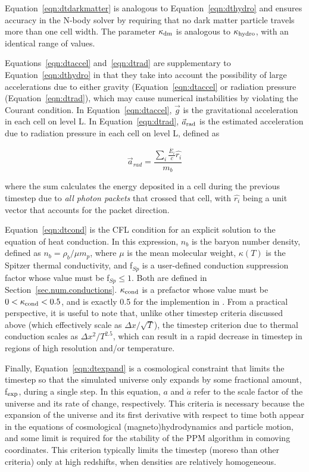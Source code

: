 Equation~\ref{eqn:dtdarkmatter} is analogous to
Equation~\ref{eqn:dthydro} and ensures accuracy in the N-body solver
by requiring that no dark matter particle travels more than one cell
width.  The parameter $\kappa_{\rm dm}$ is analogous to $\kappa_{\rm
  hydro}$, with an identical range of values.

Equations~\ref{eqn:dtaccel} and~\ref{eqn:dtrad} are supplementary to Equation~\ref{eqn:dthydro} in that they
take into account the possibility of large accelerations due to either
gravity (Equation~\ref{eqn:dtaccel} or radiation pressure
(Equation~\ref{eqn:dtrad}), which may cause numerical 
instabilities by violating the Courant condition.  In Equation~\ref{eqn:dtaccel}, $\vec{g}$ is the
gravitational acceleration in each cell on level L.  In
Equation~\ref{eqn:dtrad}, $\vec{a}_{\rm rad}$ is the estimated
acceleration due to radiation pressure in each cell on level L,
defined as

\begin{equation}
\vec{a}_{rad} = \frac{ \sum_i \frac{\dot{E_i}}{c} \hat{r_i} }{m_b} 
\end{equation}

where the sum calculates the energy deposited in a cell during the
previous timestep due to \textit{all photon packets} that crossed that
cell, with $\hat{r_i}$ being a unit vector that accounts for the
packet direction.

Equation~\ref{eqn:dtcond} is the CFL condition for an explicit
solution to the equation of heat conduction.  In this expression,
$n_b$ is the baryon number density, defined as $n_b = \rho_b / \mu
m_p$, where $\mu$ is the mean molecular weight, $\kappa(T)$ is the
Spitzer thermal conductivity, and f$_{Sp}$ is a user-defined
conduction suppression factor whose value must be f$_{Sp} \leq 1$.  Both are defined in
Section~\ref{sec.num.conductions}.  $\kappa_{\rm cond}$ is a prefactor whose
value must be $0 < \kappa_{\rm cond}  < 0.5$, and is exactly 0.5 for the
implemention in \enzo.
From a practical
perspective, it is useful to note that, unlike other timestep criteria
discussed above (which effectively scale as $\Delta x / \sqrt{T}$),
the timestep criterion due to thermal conduction scales as $\Delta x^2
/ T^{2.5}$, which can result in a rapid decrease in timestep in
regions of high resolution and/or temperature.

Finally, Equation~\ref{eqn:dtexpand} is a cosmological constraint that
limits the timestep so that the simulated universe only expands by
some fractional amount, f$_{\rm exp}$, during a single step.  In this
equation, $a$ and $\dot{a}$ refer to the scale factor of the universe
and its rate of change, respectively.  This criteria is necessary
because the expansion of the universe and its first derivative with
respect to time both appear in the equations of cosmological
(magneto)hydrodynamics and particle motion, and some limit is required
for the stability of the PPM algorithm in comoving coordinates.  This
criterion typically limits the timestep (moreso than other criteria)
only at high redshifts, when densities are relatively homogeneous.

